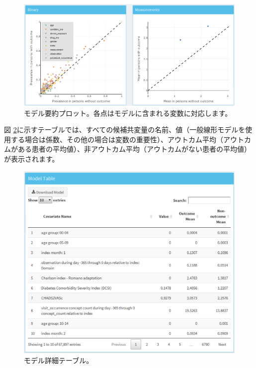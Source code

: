 \documentclass[
  11pt]{book}
\theoremstyle{definition}
\theoremstyle{definition}
\theoremstyle{definition}
\theoremstyle{definition}
\theoremstyle{remark}
\begin{document}
\begin{figure}

{\centering \includegraphics[width=1\linewidth]{images/PatientLevelPrediction/shiny/shinyModelPlots} 

}

\caption{モデル要約プロット。各点はモデルに含まれる変数に対応します。}\label{fig:shinyModelPlots}
\end{figure}

図 \ref{fig:shinyModelTable}に示すテーブルでは、すべての候補共変量の名前、値（一般線形モデルを使用する場合は係数、その他の場合は変数の重要性）、アウトカム平均（アウトカムがある患者の平均値）、非アウトカム平均（アウトカムがない患者の平均値）が表示されます。

\begin{figure}

{\centering \includegraphics[width=1\linewidth]{images/PatientLevelPrediction/shiny/shinyModelTable} 

}

\caption{モデル詳細テーブル。}\label{fig:shinyModelTable}
\end{figure}
\end{document}
